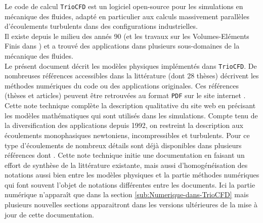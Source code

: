 Le code de calcul \texttt{TrioCFD} est un logiciel open-source \cite{TrioCFD}
pour les simulations en m\'ecanique des fluides, adapt\'e en particulier
aux calculs massivement parall\`eles d\textquoteright \'ecoulements turbulents
dans des configurations industrielles.\\
Il existe depuis le milieu des ann\'es 90 (et les travaux sur les Volumes-El\'ements
Finis dans \cite{Emon92}) et a trouv\'e des applications dans plusieurs
sous-domaines de la m\'ecanique des fluides.\\

Le pr\'esent document d\'ecrit les mod\`eles physiques impl\'ement\'es dans \texttt{TrioCFD}.
De nombreuses r\'ef\'erences
accessibles dans la litt\'erature (dont 28 th\`eses) d\'ecrivent les m\'ethodes
num\'eriques du code ou des applications originales. Ces r\'ef\'erences
(th\`eses et articles) peuvent \^etre retrouv\'ees au format \texttt{PDF}
sur le site internet \cite{TrioCFD}. Cette note technique compl\`ete
la description qualitative du site web en pr\'ecisant les mod\`eles math\'ematiques
qui sont utilis\'es dans les simulations. Compte tenu de la diversification
des applications depuis 1992, on restreint la description aux \'ecoulements
monophasiques newtoniens, incompressibles et turbulents. Pour ce type
d'\'ecoulements de nombreux d\'etails sont d\'ej\`a disponibles dans plusieurs
r\'ef\'erences dont \cite[etc ...]{Angeli_etal_NURETH2015,Angeli_etal_FVCA2017,TrioCFD}.
Cette note technique initie une documentation en faisant un effort
de synth\`ese de la litt\'erature existante, mais aussi d'homog\'en\'eisation
des notations aussi bien entre les \og mod\`eles physiques \fg{} et
la partie \og m\'ethodes num\'eriques \fg{} qui font souvent l'objet
de notations diff\'erentes entre les documents. Ici la partie num\'erique
n'appara\^it que dans la section \ref{sub:Numerique-dans-TrioCFD}
mais plusieurs nouvelles sections apparaitront dans les versions ult\'erieures
de la mise \`a jour de cette documentation.

